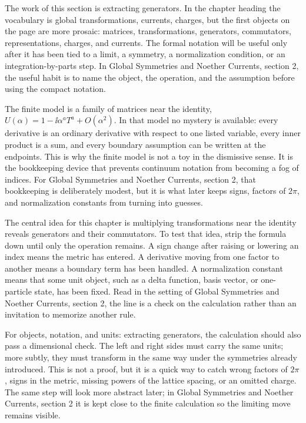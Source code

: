 The work of this section is extracting generators.  In the chapter heading the vocabulary is global transformations, currents, charges, but the first objects on the page are more prosaic: matrices, transformations, generators, commutators, representations, charges, and currents.  The formal notation will be useful only after it has been tied to a limit, a symmetry, a normalization condition, or an integration-by-parts step.  In Global Symmetries and Noether Currents, section 2, the useful habit is to name the object, the operation, and the assumption before using the compact notation.

The finite model is a family of matrices near the identity, \(U(\alpha)=1-\ii\alpha^aT^a+O(\alpha^2)\).  In that model no mystery is available: every derivative is an ordinary derivative with respect to one listed variable, every inner product is a sum, and every boundary assumption can be written at the endpoints.  This is why the finite model is not a toy in the dismissive sense.  It is the bookkeeping device that prevents continuum notation from becoming a fog of indices.  For Global Symmetries and Noether Currents, section 2, that bookkeeping is deliberately modest, but it is what later keeps signs, factors of \(2\pi\), and normalization constants from turning into guesses.

The central idea for this chapter is multiplying transformations near the identity reveals generators and their commutators.  To test that idea, strip the formula down until only the operation remains.  A sign change after raising or lowering an index means the metric has entered.  A derivative moving from one factor to another means a boundary term has been handled.  A normalization constant means that some unit object, such as a delta function, basis vector, or one-particle state, has been fixed.  Read in the setting of Global Symmetries and Noether Currents, section 2, the line is a check on the calculation rather than an invitation to memorize another rule.

For objects, notation, and units: extracting generators, the calculation should also pass a dimensional check.  The left and right sides must carry the same units; more subtly, they must transform in the same way under the symmetries already introduced.  This is not a proof, but it is a quick way to catch wrong factors of \(2\pi\), signs in the metric, missing powers of the lattice spacing, or an omitted charge.  The same step will look more abstract later; in Global Symmetries and Noether Currents, section 2 it is kept close to the finite calculation so the limiting move remains visible.

